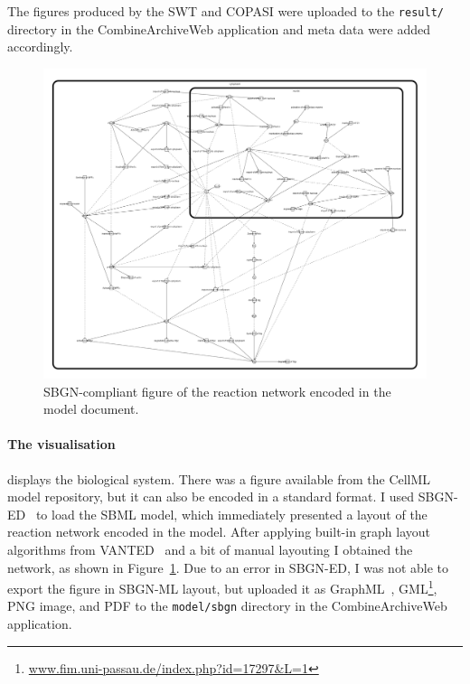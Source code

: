 The figures produced by the SWT and COPASI were uploaded to the \texttt{result/} directory in the CombineArchiveWeb application and meta data were added accordingly.



\begin{figure}
\begin{center}
\includegraphics[width=.7\textwidth]{img/Calzone2007.png}
\end{center}
\caption{SBGN-compliant figure of the reaction network encoded in the model document.}
\label{fig:sbgngraph}
\end{figure}
\paragraph{The visualisation} displays the biological system.
There was a figure available from the CellML model repository, but it can also be encoded in a standard format.
I used SBGN-ED~\cite{sbgned} to load the SBML model, which immediately presented a layout of the reaction network encoded in the model.
After applying built-in graph layout algorithms from VANTED~\cite{vanted} and a bit of manual layouting I obtained the network, as shown in Figure~\ref{fig:sbgngraph}.
Due to an error in SBGN-ED, I was not able to export the figure in SBGN-ML layout, but uploaded it as GraphML~\cite{graphml}, GML\footnote{\href{http://www.fim.uni-passau.de/index.php?id=17297&L=1}{www.fim.uni-passau.de/index.php?id=17297\&L=1}}, PNG image, and PDF to the \texttt{model/sbgn} directory in the CombineArchiveWeb application.


























